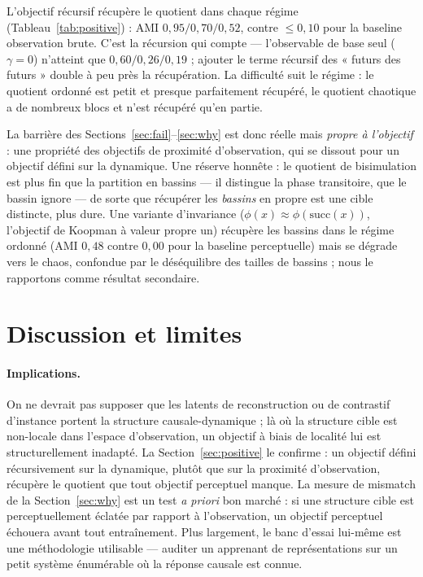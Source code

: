 \documentclass[11pt]{article}
\newcommand{\succf}{\mathrm{succ}}
\begin{document}
L'objectif récursif récupère le quotient dans chaque régime
(Tableau~\ref{tab:positive}) : AMI $0{,}95/0{,}70/0{,}52$, contre
$\le 0{,}10$ pour la baseline observation brute. C'est la récursion qui compte
--- l'observable de base seul ($\gamma{=}0$) n'atteint que
$0{,}60/0{,}26/0{,}19$ ; ajouter le terme récursif des « futurs des futurs »
double à peu près la récupération. La difficulté suit le régime : le quotient
ordonné est petit et presque parfaitement récupéré, le quotient chaotique a de
nombreux blocs et n'est récupéré qu'en partie.

La barrière des Sections~\ref{sec:fail}--\ref{sec:why} est donc réelle mais
\emph{propre à l'objectif} : une propriété des objectifs de proximité
d'observation, qui se dissout pour un objectif défini sur la dynamique. Une
réserve honnête : le quotient de bisimulation est plus fin que la partition en
bassins --- il distingue la phase transitoire, que le bassin ignore --- de sorte
que récupérer les \emph{bassins} en propre est une cible distincte, plus dure.
Une variante d'invariance ($\phi(x)\approx\phi(\succf(x))$, l'objectif de
Koopman à valeur propre un) récupère les bassins dans le régime ordonné
(AMI $0{,}48$ contre $0{,}00$ pour la baseline perceptuelle) mais se dégrade
vers le chaos, confondue par le déséquilibre des tailles de bassins ; nous le
rapportons comme résultat secondaire.

\section{Discussion et limites}

\paragraph{Implications.}
On ne devrait pas supposer que les latents de reconstruction ou de contrastif
d'instance portent la structure causale-dynamique ; là où la structure cible
est non-locale dans l'espace d'observation, un objectif à biais de localité lui
est structurellement inadapté. La Section~\ref{sec:positive} le confirme : un
objectif défini récursivement sur la dynamique, plutôt que sur la proximité
d'observation, récupère le quotient que tout objectif perceptuel manque.
La mesure de mismatch de la
Section~\ref{sec:why} est un test \emph{a priori} bon marché : si une structure
cible est perceptuellement éclatée par rapport à l'observation, un objectif
perceptuel échouera avant tout entraînement. Plus largement, le banc d'essai
lui-même est une méthodologie utilisable --- auditer un apprenant de
représentations sur un petit système énumérable où la réponse causale est
connue.
\end{document}
